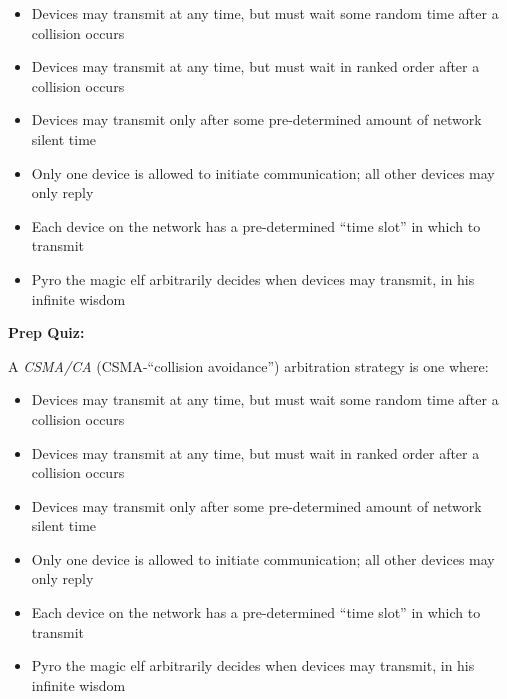 \begin{itemize}
\item{} Devices may transmit at any time, but must wait some random time after a collision occurs
\vskip 5pt 
\item{} Devices may transmit at any time, but must wait in ranked order after a collision occurs
\vskip 5pt 
\item{} Devices may transmit only after some pre-determined amount of network silent time
\vskip 5pt 
\item{} Only one device is allowed to initiate communication; all other devices may only reply
\vskip 5pt 
\item{} Each device on the network has a pre-determined ``time slot'' in which to transmit
\vskip 5pt 
\item{} Pyro the magic elf arbitrarily decides when devices may transmit, in his infinite wisdom
\end{itemize}








\vfil \eject

\noindent
{\bf Prep Quiz:}

A {\it CSMA/CA} (CSMA-``collision avoidance'') arbitration strategy is one where:

\begin{itemize}
\item{} Devices may transmit at any time, but must wait some random time after a collision occurs
\vskip 5pt 
\item{} Devices may transmit at any time, but must wait in ranked order after a collision occurs
\vskip 5pt 
\item{} Devices may transmit only after some pre-determined amount of network silent time
\vskip 5pt 
\item{} Only one device is allowed to initiate communication; all other devices may only reply
\vskip 5pt 
\item{} Each device on the network has a pre-determined ``time slot'' in which to transmit
\vskip 5pt 
\item{} Pyro the magic elf arbitrarily decides when devices may transmit, in his infinite wisdom
\end{itemize}











